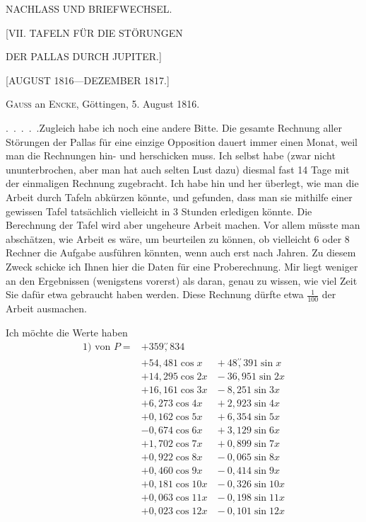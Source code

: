 \begingroup
{}
\clearpage
{}
\begin{center}
\large NACHLASS UND BRIEFWECHSEL.
\par\bigskip
\Large [VII. TAFELN FÜR DIE STÖRUNGEN\par DER PALLAS DURCH JUPITER.]
\par\medskip
\normalsize [AUGUST 1816---DEZEMBER 1817.]
\par\bigskip
[1.]
\par\medskip
\textsc{Gauss} an \textsc{Encke}, Göttingen, 5. August 1816.
\end{center}
\par\noindent\hspace*{\parindent}.\ .\ .\ .\ .\quad Zugleich habe ich noch eine andere Bitte. Die gesamte Rechnung
aller Störungen der Pallas für eine einzige Opposition dauert immer
einen Monat, weil man die Rechnungen hin- und herschicken muss. Ich selbst
habe (zwar nicht ununterbrochen, aber man hat auch selten Lust dazu)
diesmal fast 14 Tage mit der einmaligen Rechnung zugebracht. Ich habe hin
und her überlegt, wie man die Arbeit durch Tafeln abkürzen könnte,
und gefunden, dass man sie mithilfe einer gewissen Tafel tatsächlich
vielleicht in 3 Stunden erledigen könnte. Die Berechnung der Tafel wird
aber ungeheure Arbeit machen. Vor allem müsste man abschätzen, wie
 Arbeit es wäre, um beurteilen zu können, ob vielleicht 6 oder 8 Rechner
die Aufgabe ausführen könnten, wenn auch erst nach Jahren. Zu diesem Zweck
schicke ich Ihnen hier die Daten für eine Proberechnung. Mir liegt
weniger an den Ergebnissen (wenigstens vorerst) als daran, genau zu wissen,
wie viel Zeit Sie dafür etwa gebraucht haben werden. Diese Rechnung dürfte
etwa \(\tfrac{1}{100}\) der  Arbeit ausmachen.
\par\noindent\hspace*{\parindent}Ich möchte die Werte haben
\[
\begin{aligned}
\text{1) von }P={}&+359\overset{\prime\prime}{,}834\\
&+54{,}481\cos x &{}+48\overset{\prime\prime}{,}391\sin x\\
&+14{,}295\cos2x &{}-36{,}951\sin2x\\
&+16{,}161\cos3x &{}-8{,}251\sin3x\\
&+6{,}273\cos4x &{}+2{,}923\sin4x\\
&+0{,}162\cos5x &{}+6{,}354\sin5x\\
&-0{,}674\cos6x &{}+3{,}129\sin6x\\
&+1{,}702\cos7x &{}+0{,}899\sin7x\\
&+0{,}922\cos8x &{}-0{,}065\sin8x\\
&+0{,}460\cos9x &{}-0{,}414\sin9x\\
&+0{,}181\cos10x &{}-0{,}326\sin10x\\
&+0{,}063\cos11x &{}-0{,}198\sin11x\\
&+0{,}023\cos12x &{}-0{,}101\sin12x
\end{aligned}
\]
